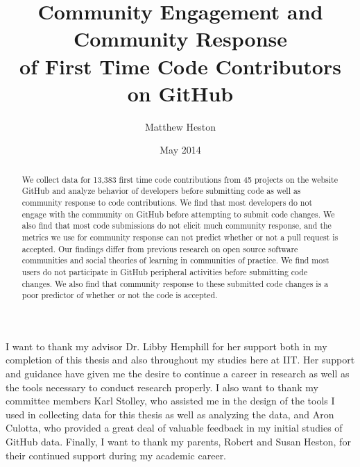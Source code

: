 \documentclass{iitthesis}
\begin{document}
\title{Community Engagement and Community Response \\
of First Time Code Contributors on GitHub}
\author{Matthew Heston}
\date{May 2014}
\maketitle                %


\prelimpages         %


\begin{acknowledgement}     %
\par  I want to thank my advisor Dr. Libby Hemphill for her support both in my
completion of this thesis and also throughout my studies here at IIT. Her
support and guidance have given me the desire to continue a career in research
as well as the tools necessary to conduct research properly. I also want to
thank my committee members Karl Stolley, who assisted me in the design of the
tools I used in collecting data for this thesis as well as analyzing the data,
and Aron Culotta, who provided a great deal of valuable feedback in my initial
studies of GitHub data. Finally, I want to thank my parents, Robert and Susan
Heston, for their continued support during my academic career.
\end{acknowledgement}


\tableofcontents
\clearpage

\listoftables

\clearpage

\listoffigures

\clearpage



\begin{abstract}           %
We collect data for 13,383 first time code contributions from 45 projects on the
website GitHub and analyze behavior of developers before submitting code as well
as community response to code contributions. We find that most developers do not
engage with the community on GitHub before attempting to submit code changes. We
also find that most code submissions do not elicit much community response, and
the metrics we use for community response can not predict whether or not a pull
request is accepted. Our findings differ from previous research on open source
software communities and social theories of learning in communities of practice.
We find most users do not participate in GitHub peripheral activities before
submitting code changes. We also find that community response to these submitted
code changes is a poor predictor of whether or not the code is accepted.
\end{abstract}
\end{document}
